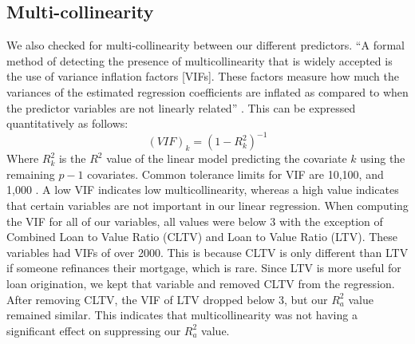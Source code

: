\documentclass[12 pt]{uncw_thesis}
\theoremstyle{plain}
\theoremstyle{remark}
\theoremstyle{definition}
\begin{document}
\subsection{Multi-collinearity}
We also checked for multi-collinearity between our different predictors. ``A formal method of detecting the presence of multicollinearity that is widely accepted is the use of variance inflation factors [VIFs]. These factors measure how much the variances of the estimated regression coefficients are inflated as compared to when the predictor variables are not linearly related'' \cite{512}. This can be expressed quantitatively as follows: 
\[(VIF)_k = (1-R_k^2)^{-1}\]
Where $R_k^2$ is the $R^2$ value of the linear model predicting the covariate $k$ using the remaining $p-1$ covariates. Common tolerance limits for VIF are 10,100, and 1,000 \cite[p.~408-410]{512}. A low VIF indicates low multicollinearity, whereas a high value indicates that certain variables are not important in our linear regression. 
When computing the VIF for all of our variables, all values were below 3 with the exception of Combined Loan to Value Ratio (CLTV) and Loan to Value Ratio (LTV). These variables had VIFs of over 2000. This is because CLTV is only different than LTV if someone refinances their mortgage, which is rare. Since LTV is more useful for loan origination, we kept that variable and removed CLTV from the regression. After removing CLTV, the VIF of LTV dropped below 3, but our \(R^2_a\) value remained similar. This indicates that multicollinearity was not having a significant effect on suppressing our \(R^2_a\) value.
\end{document}
